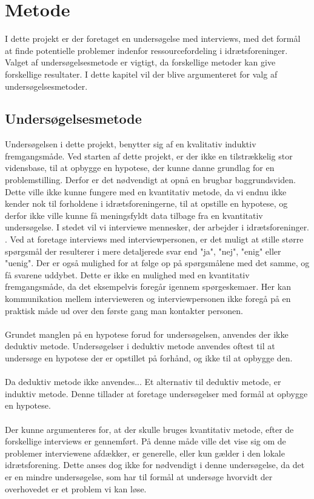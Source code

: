 \chapter{Metode}\label{ch:ch2label}
I dette projekt er der foretaget en undersøgelse med interviews, med det formål at finde potentielle problemer indenfor ressourcefordeling i idrætsforeninger. Valget af undersøgelsesmetode er vigtigt, da forskellige metoder kan give forskellige resultater. I dette kapitel vil der blive argumenteret for valg af undersøgelsesmetoder.


\section{Undersøgelsesmetode}
Undersøgelsen i dette projekt, benytter sig af en kvalitativ induktiv fremgangsmåde. Ved starten af dette projekt, er der ikke en tilstrækkelig stor vidensbase, til at opbygge en hypotese, der kunne danne grundlag for en problemstilling. Derfor er det nødvendigt at opnå en brugbar baggrundsviden. Dette ville ikke kunne fungere med en kvantitativ metode, da vi endnu ikke kender nok til forholdene i idrætsforeningerne, til at opstille en hypotese, og derfor ikke ville kunne få meningsfyldt data tilbage fra en kvantitativ undersøgelse. I stedet vil vi interviewe mennesker, der arbejder i idrætsforeninger.
\\.
Ved at foretage interviews med interviewpersonen, er det muligt at stille større spørgsmål der resulterer i mere detaljerede svar end "ja", "nej", "enig" eller "uenig". Der er også mulighed for at følge op på spørgsmålene med det samme, og få svarene uddybet. Dette er ikke en mulighed med en kvantitativ fremgangsmåde, da det eksempelvis foregår igennem spørgeskemaer. Her kan kommunikation mellem intervieweren og interviewpersonen ikke foregå på en praktisk måde ud over den første gang man kontakter personen.
\\
\\
Grundet manglen på en hypotese forud for undersøgelsen, anvendes der ikke deduktiv metode. Undersøgelser i deduktiv metode  anvendes oftest til at undersøge en hypotese der er opstillet på forhånd, og ikke til at opbygge den.
\\
\\ %
Da deduktiv metode ikke anvendes...
Et alternativ til deduktiv metode, er induktiv metode. Denne tillader at foretage undersøgelser med formål at opbygge en hypotese.
\\
\\
Der kunne argumenteres for, at der skulle bruges kvantitativ metode, efter de forskellige interviews er gennemført. På denne måde ville det vise sig om de problemer interviewene afdækker, er generelle, eller kun gælder i den lokale idrætsforening. Dette anses dog ikke for nødvendigt i denne undersøgelse, da det er en mindre undersøgelse, som har til formål at undersøge hvorvidt der overhovedet er et problem vi kan løse.\\




